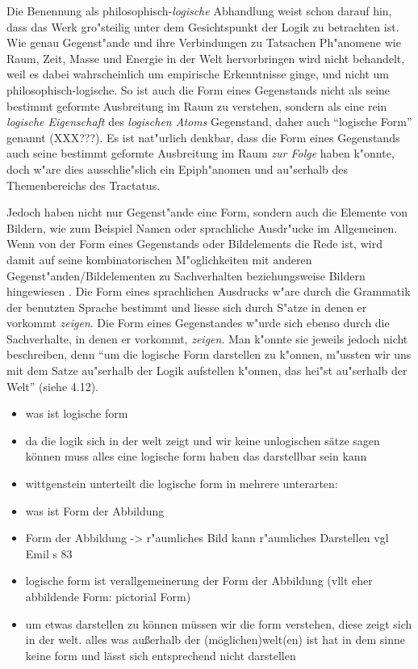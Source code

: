 \documentclass[a4paper, emulatestandardclasses, 12pt]{scrartcl}
\begin{document}
\begin{onehalfspace}
\noindent Die Benennung als philosophisch-\emph{logische} Abhandlung weist schon darauf hin, dass das Werk gro"steilig unter dem Gesichtspunkt der Logik zu betrachten ist. Wie genau Gegenst"ande und ihre Verbindungen zu Tatsachen Ph"anomene wie Raum, Zeit, Masse und Energie in der Welt hervorbringen wird nicht behandelt, weil es dabei wahrscheinlich um empirische Erkenntnisse ginge, und nicht um philosophisch-logische. So ist auch die Form eines Gegenstands nicht als seine bestimmt geformte Ausbreitung im Raum zu verstehen, sondern als eine rein \emph{logische Eigenschaft} des \emph{logischen Atoms} Gegenstand, daher auch "`logische Form"' genannt (XXX???). Es ist nat"urlich denkbar, dass die Form eines Gegenstands auch seine bestimmt geformte Ausbreitung im Raum \emph{zur Folge} haben k"onnte, doch w"are dies ausschlie"slich ein Epiph"anomen und au"serhalb des Themenbereichs des Tractatus. 

Jedoch haben nicht nur Gegenst"ande eine Form, sondern auch die Elemente von Bildern, wie zum Beispiel Namen oder sprachliche Ausdr"ucke im Allgemeinen. Wenn von der Form eines Gegenstands oder Bildelements die Rede ist, wird damit auf seine kombinatorischen M"oglichkeiten mit anderen Gegenst"anden/Bildelementen zu Sachverhalten beziehungsweise Bildern hingewiesen \cite[vgl.][S. 84]{emiliani1999formsp}. Die Form eines sprachlichen Ausdrucks w"are durch die Grammatik der benutzten Sprache bestimmt und liesse sich durch S"atze in denen er vorkommt \emph{zeigen}. Die Form eines Gegenstandes w"urde sich ebenso durch die Sachverhalte, in denen er vorkommt, \emph{zeigen}. Man k"onnte sie jeweils jedoch nicht beschreiben, denn "`um die logische Form darstellen zu k"onnen, m"ussten wir uns mit dem Satze au"serhalb der Logik aufstellen k"onnen, das hei"st au"serhalb der Welt"' (siehe 4.12). 


\begin{itemize}
  \item was ist logische form
  \item da die logik sich in der welt zeigt und wir keine unlogischen sätze sagen können muss alles eine logische form haben das darstellbar sein kann
  \item wittgenstein unterteilt die logische form in mehrere unterarten:
  \item was ist Form der Abbildung
  \item Form der Abbildung -> r"aumliches Bild kann r"aumliches Darstellen vgl Emil s 83
  \item logische form ist verallgemeinerung der Form der Abbildung (vllt eher abbildende Form: pictorial Form)
  \item um etwas darstellen zu können müssen wir die form verstehen, diese zeigt sich in der welt. alles was außerhalb der (möglichen)welt(en) ist hat in dem sinne keine form und lässt sich entsprechend nicht darstellen
\end{itemize}




\end{onehalfspace}
\end{document}
